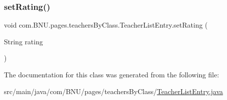 \subsubsection{\texorpdfstring{set\+Rating()}{setRating()}}
{\footnotesize\ttfamily void com.\+B\+N\+U.\+pages.\+teachers\+By\+Class.\+Teacher\+List\+Entry.\+set\+Rating (\begin{DoxyParamCaption}\item[{String}]{rating }\end{DoxyParamCaption})}



The documentation for this class was generated from the following file\+:\begin{DoxyCompactItemize}
\item 
src/main/java/com/\+B\+N\+U/pages/teachers\+By\+Class/\mbox{\hyperlink{_teacher_list_entry_8java}{Teacher\+List\+Entry.\+java}}\end{DoxyCompactItemize}
